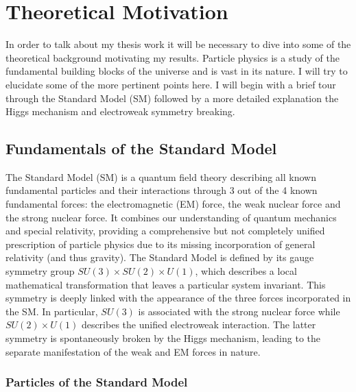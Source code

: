 \chapter{Theoretical  Motivation}

In order to talk about my thesis work it will be necessary to dive into some of the theoretical
background motivating my results. Particle physics is a study of the fundamental building blocks
of the universe and is vast in its nature. I will try to elucidate some of the more pertinent points here. 
I will begin with a brief tour through the Standard Model (SM) followed by a more detailed explanation
the Higgs mechanism and electroweak symmetry breaking.

\section{Fundamentals of the Standard Model}

The Standard Model (SM) is a quantum field theory describing all known fundamental particles and 
their interactions through 3 out of the 4 known fundamental forces: the electromagnetic (EM) force, the 
weak nuclear force and the strong nuclear force. It combines our understanding of quantum mechanics and 
special relativity, providing a comprehensive but not completely unified prescription of particle physics 
due to its missing incorporation of general relativity (and thus gravity). The Standard Model 
is defined by its gauge symmetry group $SU(3)\times SU(2)\times U(1)$, which describes a local mathematical 
transformation that leaves a particular system invariant. This symmetry is deeply linked with the 
appearance of the three forces incorporated in the SM. In particular, $SU(3)$ is associated with the strong 
nuclear force while $SU(2)\times U(1)$ describes the unified electroweak interaction. The latter symmetry is 
spontaneously broken by the Higgs mechanism, leading to the separate manifestation of the weak and 
EM forces in nature. \par

\subsection{Particles of the Standard Model}

